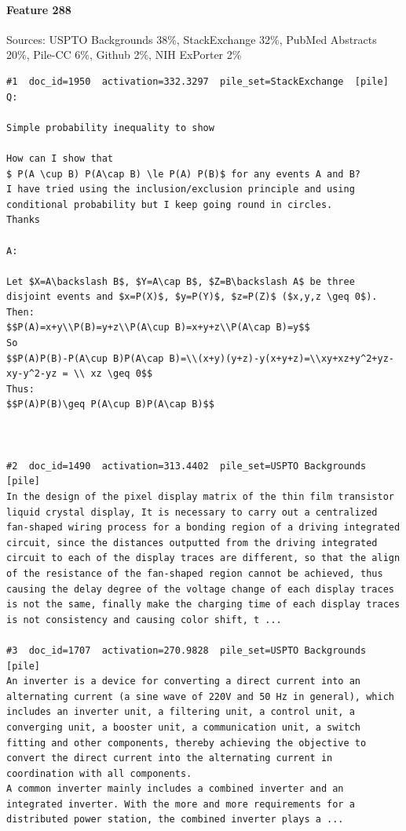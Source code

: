 \paragraph*{Feature 288} Sources: USPTO Backgrounds 38\%, StackExchange 32\%, PubMed Abstracts 20\%, Pile-CC 6\%, Github 2\%, NIH ExPorter 2\%

\begin{verbatim}
#1  doc_id=1950  activation=332.3297  pile_set=StackExchange  [pile]
Q:

Simple probability inequality to show

How can I show that 
$ P(A \cup B) P(A\cap B) \le P(A) P(B)$ for any events A and B?
I have tried using the inclusion/exclusion principle and using conditional probability but I keep going round in circles.
Thanks

A:

Let $X=A\backslash B$, $Y=A\cap B$, $Z=B\backslash A$ be three disjoint events and $x=P(X)$, $y=P(Y)$, $z=P(Z)$ ($x,y,z \geq 0$). 
Then:
$$P(A)=x+y\\P(B)=y+z\\P(A\cup B)=x+y+z\\P(A\cap B)=y$$
So
$$P(A)P(B)-P(A\cup B)P(A\cap B)=\\(x+y)(y+z)-y(x+y+z)=\\xy+xz+y^2+yz-xy-y^2-yz = \\ xz \geq 0$$
Thus:
$$P(A)P(B)\geq P(A\cup B)P(A\cap B)$$



#2  doc_id=1490  activation=313.4402  pile_set=USPTO Backgrounds  [pile]
In the design of the pixel display matrix of the thin film transistor liquid crystal display, It is necessary to carry out a centralized fan-shaped wiring process for a bonding region of a driving integrated circuit, since the distances outputted from the driving integrated circuit to each of the display traces are different, so that the align of the resistance of the fan-shaped region cannot be achieved, thus causing the delay degree of the voltage change of each display traces is not the same, finally make the charging time of each display traces is not consistency and causing color shift, t ...

#3  doc_id=1707  activation=270.9828  pile_set=USPTO Backgrounds  [pile]
An inverter is a device for converting a direct current into an alternating current (a sine wave of 220V and 50 Hz in general), which includes an inverter unit, a filtering unit, a control unit, a converging unit, a booster unit, a communication unit, a switch fitting and other components, thereby achieving the objective to convert the direct current into the alternating current in coordination with all components.
A common inverter mainly includes a combined inverter and an integrated inverter. With the more and more requirements for a distributed power station, the combined inverter plays a ...


\end{verbatim}
